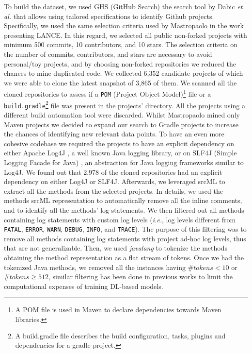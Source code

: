 To build the dataset, we used GHS (GitHub Search) the search tool by Dabic \emph{et al.} \cite{dabic2021sampling} that allows using tailored specifications to identify Github \cite{github} projects. Specifically, we used the same selection criteria used by Mastropaolo \etal \cite{mastropaolo2022using} in the work presenting LANCE.
In this regard, we selected all public non-forked \java projects with minimum 500 commits, 10 contributors, and 10 stars.
The selection criteria on the number of commits, contributors, and stars are necessary to avoid personal/toy projects, and 
by choosing non-forked repositories we reduced the chances to mine duplicated code. 
We collected 6,352 candidate projects of which we were able to clone the latest snapshot of 3,865 of them. 
We scanned all the cloned repositories to assess if a \texttt{POM} (Project Object Model)\footnote{A POM file is used in Maven to declare dependencies towards Maven libraries.} file or a \texttt{build.gradle}\footnote{A build.gradle file describes the build configuration, tasks, plugins and dependencies for a gradle project.} file was present in the projects' directory.
All the projects using a different build automation tool were discarded.
Whilst Mastropaolo \etal \cite{mastropaolo2022using} mined only Maven projects we decided to expand our search to Gradle projects to increase the chances of identifying new relevant data points.
To have an even more cohesive codebase we required the projects to have an explicit dependency on either Apache Log4J \cite{log4j}, a well known Java logging library, or on SLF4J (Simple Logging Facade for Java) \cite{slf4j}, an abstraction for Java logging frameworks similar to Log4J.
We found out that 2,978 of the cloned repositories had an explicit dependency on either Log4J or SLF4J. Afterwards, we leveraged srcML \cite{srcml} to extract all the \java methods from the selected projects. In details, we used the \java methods srcML representation to automatically remove all the inline comments, and to identify all the methods' log statements. We then filtered out all methods containing log statements with custom log levels (\emph{i.e.}, log levels different from \texttt{FATAL}, \texttt{ERROR}, \texttt{WARN}, \texttt{DEBUG}, \texttt{INFO}, and \texttt{TRACE}).
The purpose of this filtering was to remove all methods containing log statements with project ad-hoc log levels, thus that are not generalizable.
Then, we used \emph{javalang} \cite{javalang} to tokenize the methods obtaining the method representation as a flat stream of tokens.
Once we had the tokenized Java methods, we removed all the instances having $\#tokens < 10$ or $\#tokens \geq 512$, similar filtering has been done in previous works \cite{mastropaolo2021empirical,tufano2021automating,tufano2022using,ciniselli2021empirical, Tufano:tosem2019} to limit the computational expenses of training DL-based models.
